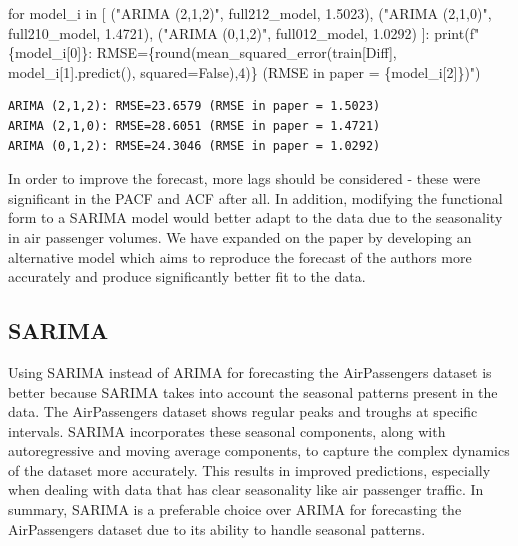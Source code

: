 \documentclass[
  letterpaper,
  DIV=11,
  numbers=noendperiod]{scrartcl}
\newenvironment{Shaded}{\begin{snugshade}}{\end{snugshade}}
\newcommand{\BuiltInTok}[1]{\textcolor[rgb]{0.00,0.23,0.31}{#1}}
\newcommand{\ControlFlowTok}[1]{\textcolor[rgb]{0.00,0.23,0.31}{#1}}
\newcommand{\DecValTok}[1]{\textcolor[rgb]{0.68,0.00,0.00}{#1}}
\newcommand{\FloatTok}[1]{\textcolor[rgb]{0.68,0.00,0.00}{#1}}
\newcommand{\KeywordTok}[1]{\textcolor[rgb]{0.00,0.23,0.31}{#1}}
\newcommand{\NormalTok}[1]{\textcolor[rgb]{0.00,0.23,0.31}{#1}}
\newcommand{\OperatorTok}[1]{\textcolor[rgb]{0.37,0.37,0.37}{#1}}
\newcommand{\SpecialCharTok}[1]{\textcolor[rgb]{0.37,0.37,0.37}{#1}}
\newcommand{\SpecialStringTok}[1]{\textcolor[rgb]{0.13,0.47,0.30}{#1}}
\newcommand{\StringTok}[1]{\textcolor[rgb]{0.13,0.47,0.30}{#1}}
\newcommand{\VariableTok}[1]{\textcolor[rgb]{0.07,0.07,0.07}{#1}}
\begin{document}
\begin{Shaded}
\begin{Highlighting}[]
\ControlFlowTok{for}\NormalTok{ model\_i }\KeywordTok{in}\NormalTok{ [}
\NormalTok{    (}\StringTok{"ARIMA (2,1,2)"}\NormalTok{, full212\_model, }\FloatTok{1.5023}\NormalTok{),}
\NormalTok{    (}\StringTok{"ARIMA (2,1,0)"}\NormalTok{, full210\_model, }\FloatTok{1.4721}\NormalTok{),}
\NormalTok{    (}\StringTok{"ARIMA (0,1,2)"}\NormalTok{, full012\_model, }\FloatTok{1.0292}\NormalTok{)}
\NormalTok{]:}
    \BuiltInTok{print}\NormalTok{(}\SpecialStringTok{f"}\SpecialCharTok{\{}\NormalTok{model\_i[}\DecValTok{0}\NormalTok{]}\SpecialCharTok{\}}\SpecialStringTok{: RMSE=}\SpecialCharTok{\{}\BuiltInTok{round}\NormalTok{(mean\_squared\_error(train[}\StringTok{\textquotesingle{}Diff\textquotesingle{}}\NormalTok{], model\_i[}\DecValTok{1}\NormalTok{].predict(), squared}\OperatorTok{=}\VariableTok{False}\NormalTok{),}\DecValTok{4}\NormalTok{)}\SpecialCharTok{\}}\SpecialStringTok{ (RMSE in paper = }\SpecialCharTok{\{}\NormalTok{model\_i[}\DecValTok{2}\NormalTok{]}\SpecialCharTok{\}}\SpecialStringTok{)"}\NormalTok{)}
    
\end{Highlighting}
\end{Shaded}

\begin{verbatim}
ARIMA (2,1,2): RMSE=23.6579 (RMSE in paper = 1.5023)
ARIMA (2,1,0): RMSE=28.6051 (RMSE in paper = 1.4721)
ARIMA (0,1,2): RMSE=24.3046 (RMSE in paper = 1.0292)
\end{verbatim}

In order to improve the forecast, more lags should be considered - these
were significant in the PACF and ACF after all. In addition, modifying
the functional form to a SARIMA model would better adapt to the data due
to the seasonality in air passenger volumes. We have expanded on the
paper by developing an alternative model which aims to reproduce the
forecast of the authors more accurately and produce significantly better
fit to the data.

\hypertarget{sarima}{%
\subsection{SARIMA}\label{sarima}}

Using SARIMA instead of ARIMA for forecasting the AirPassengers dataset
is better because SARIMA takes into account the seasonal patterns
present in the data. The AirPassengers dataset shows regular peaks and
troughs at specific intervals. SARIMA incorporates these seasonal
components, along with autoregressive and moving average components, to
capture the complex dynamics of the dataset more accurately. This
results in improved predictions, especially when dealing with data that
has clear seasonality like air passenger traffic. In summary, SARIMA is
a preferable choice over ARIMA for forecasting the AirPassengers dataset
due to its ability to handle seasonal patterns.
\end{document}
